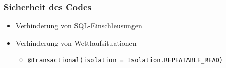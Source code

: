 \begin{frame}\frametitle{Sicherheit des Codes}
\begin{itemize}
	\item Verhinderung von SQL-Einschleusungen
	\item Verhinderung von Wettlaufsituationen
	\begin{itemize}
		\item \texttt{@Transactional(isolation = Isolation.REPEATABLE\_READ)}
	\end{itemize}
\end{itemize}
\end{frame}
